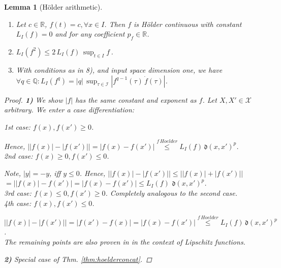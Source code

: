 \documentclass{article} %
\newtheorem{lem}[thm]{Lemma}
\theoremstyle{definition}
\theoremstyle{remark}
\newcommand{\abs}[1]{\left\vert#1\right\vert}
\newcommand{\Real}{\mathbb R}
\newcommand{\inspace}{\ensuremath{ \mathcal X}}
\newcommand{\indset}{\ensuremath{ \mathcal I}}
\newcommand{\metric}{\, \mathfrak{d}} %
\begin{document}
\begin{lem}[H\"older arithmetic]
\begin{enumerate}
	For one-dimensional input space, $\inspace = \Real$, $L_I(f) = \sup_{x \in I } \abs{\nabla f(x)}$ is the smallest Lipschitz number. 
	 \item Let $c \in \Real$, $f( t) = c, \forall x \in I $. Then $f$ is H\"older continuous with constant $L_I(f) =0$ and for any coefficient $p_f \in \Real$.  
	\item $L_I(f^2) \leq 2 \, L_I(f)\, \sup_{t \in I} f\,$.
	\item With conditions as in 8), and input space dimension one, we have $\forall q \in \mathbb Q : L_I(f^q) = |q| \,\sup_{\tau \in \indset } |f^{q-1}(\tau) \, \dot f(\tau)| $.
\end{enumerate}
\begin{proof}

\textbf{1)}  We show $|f|$ has the same constant and exponent as $f$. Let $X,X' \in \inspace $ arbitrary. 
We enter a case differentiation:

\textit{1st case: $f(x), f(x') \geq 0$}. 

Hence, $\bigl| \abs{f(x)}- \abs{f(x')} \bigr| = \bigl| f(x) - f(x') \bigr|  \stackrel{f \,Hoelder}{\leq} L_I(f) \metric(x,x')^{p}$.\\

\textit{2nd case: $f(x) \geq 0, f(x') \leq 0$.} 

Note, $|y| = - y$, iff $y \leq 0$. Hence,  $\bigl| |f(x)| - |f(x')| \bigr| \leq \bigl| |f(x)| + |f(x')| \bigr| $
$= \bigl| |f(x)| - f(x') \bigr|  =  \bigl| f(x) - f(x') \bigr| \leq L_I(f) \, \metric(x,x')^{p}$.\\

\textit{3rd case: $f(x) \leq 0, f(x') \geq 0$.} Completely analogous to the second case.\\

\textit{4th case: $f(x), f(x') \leq 0$}. 

$\bigl| |f(x)| - |f(x')| \bigr| = \bigl| f(x') - f(x) \bigr|= \bigl| f(x) - f(x') \bigr|  \stackrel{f \, Hoelder}{\leq} L_I(f) \metric(x,x')^{p}$.\\

The remaining points are also proven in \cite{Weaver1999} in the context of Lipschitz functions.

\textbf{2)} Special case of Thm. \ref{thm:hoelderconcat}.
%


\end{proof}
\end{lem}
\end{document}
